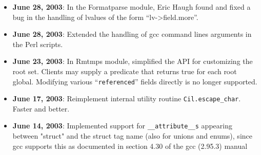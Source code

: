 \documentclass{article}
\def\t#1{{\tt #1}}
\begin{document}
\begin{itemize}
\item {\bf June 28, 2003}: In the Formatparse module, Eric Haugh found and
  fixed a bug in the handling of lvalues of the form ``lv->field.more''.

\item {\bf June 28, 2003}: Extended the handling of gcc command lines
arguments in the Perl scripts. 

\item {\bf June 23, 2003}: In Rmtmps module, simplified the API for
  customizing the root set.  Clients may supply a predicate that
  returns true for each root global.  Modifying various
  ``\texttt{referenced}'' fields directly is no longer supported.

\item {\bf June 17, 2003}: Reimplement internal utility routine
           \t{Cil.escape\_char}. Faster and better. 

\item {\bf June 14, 2003}: Implemented support for \t{\_\_attribute\_\_s}
appearing between "struct" and the struct tag name (also for unions and
enums), since gcc supports this as documented in section 4.30 of the gcc
(2.95.3) manual


\end{itemize}
\end{document}
